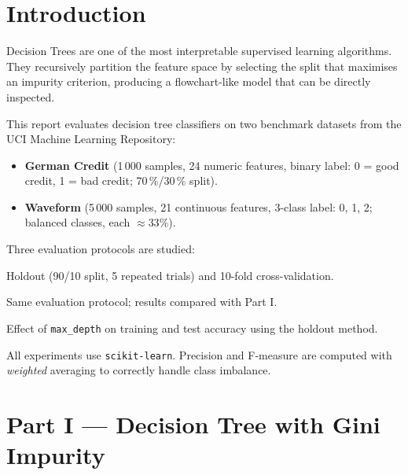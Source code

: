 \documentclass[12pt,a4paper]{article}
\begin{document}
\tableofcontents
\newpage

\section{Introduction}

Decision Trees are one of the most interpretable supervised learning
algorithms. They recursively partition the feature space by selecting the
split that maximises an impurity criterion, producing a flowchart-like
model that can be directly inspected.

This report evaluates decision tree classifiers on two benchmark datasets
from the UCI Machine Learning Repository:

\begin{itemize}
  \item \textbf{German Credit} (1\,000 samples, 24 numeric features,
    binary label: 0 = good credit, 1 = bad credit; 70\,\%/30\,\% split).
  \item \textbf{Waveform} (5\,000 samples, 21 continuous features,
    3-class label: 0, 1, 2; balanced classes, each $\approx 33\%$).
\end{itemize}

Three evaluation protocols are studied:

\begin{description}[style=nextline]
  \item[Part I --- Gini impurity.]
    Holdout (90/10 split, 5 repeated trials) and 10-fold cross-validation.
  \item[Part II --- Entropy impurity.]
    Same evaluation protocol; results compared with Part I.
  \item[Part III --- Tree depth.]
    Effect of \texttt{max\_depth} on training and test accuracy using the
    holdout method.
\end{description}

All experiments use \texttt{scikit-learn}. Precision and F-measure are
computed with \emph{weighted} averaging to correctly handle class imbalance.

\section{Part I --- Decision Tree with Gini Impurity}
\end{document}
